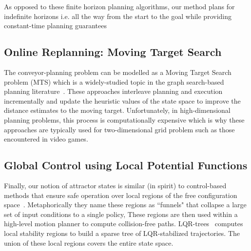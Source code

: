 \documentclass[a4paper,10pt]{article}
\begin{document}
As opposed to these finite horizon planning algorithms, our method plans for indefinite horizons i.e. all the way from the start to the goal while providing constant-time planning guarantees

\subsection{Online Replanning: Moving Target Search}
The conveyor-planning problem can be modelled as a Moving Target Search problem (MTS) which is a widely-studied topic in the graph search-based planning literature~\cite{ishida1991moving,ishida1995moving,koenig2007speeding,sun2010moving}. 
These approaches interleave planning and execution incrementally and update the heuristic values of the state space to improve the distance estimates to the moving target. Unfortunately, in high-dimensional planning problems, this process is computationally expensive which is why these approaches are typically used for two-dimensional grid problem such as those encountered in video games.

\subsection{Global Control using Local Potential Functions}
Finally, our notion of attractor states is similar (in spirit) to control-based methods that  ensure safe operation over local regions of the free configuration space~\cite{CRC03,CCR06,tedrake2010lqr}. Metaphorically they name these regions as ``funnels" that collapse a large set of input conditions to a single policy,
These regions are then used within a high-level motion planner to compute collision-free paths. LQR-trees~\cite{tedrake2010lqr} computes local stability regions to build a sparse tree of LQR-stabilized trajectories. The union of these local regions covers the entire state space.
\end{document}
